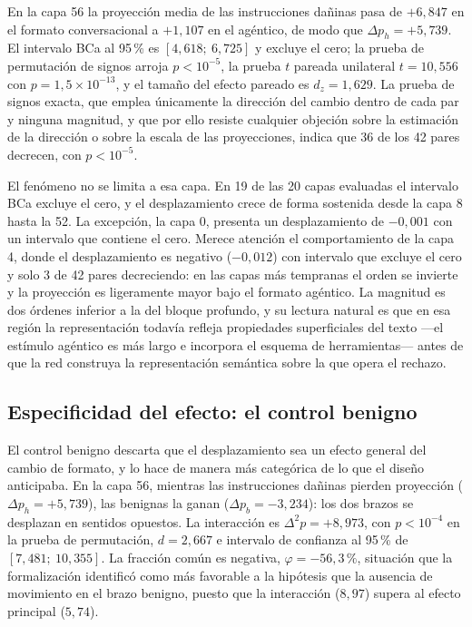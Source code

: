 \documentclass[12pt,a4paper]{article}
\begin{document}
En la capa 56 la proyección media de las instrucciones dañinas pasa de $+6{,}847$ en el formato conversacional a $+1{,}107$ en el agéntico, de modo que $\Delta p_{h} = +5{,}739$. El intervalo BCa al 95\,\% es $[4{,}618;\ 6{,}725]$ y excluye el cero; la prueba de permutación de signos arroja $p < 10^{-5}$, la prueba $t$ pareada unilateral $t = 10{,}556$ con $p = 1{,}5 \times 10^{-13}$, y el tamaño del efecto pareado es $d_z = 1{,}629$. La prueba de signos exacta, que emplea únicamente la dirección del cambio dentro de cada par y ninguna magnitud, y que por ello resiste cualquier objeción sobre la estimación de la dirección o sobre la escala de las proyecciones, indica que 36 de los 42 pares decrecen, con $p < 10^{-5}$.

El fenómeno no se limita a esa capa. En 19 de las 20 capas evaluadas el intervalo BCa excluye el cero, y el desplazamiento crece de forma sostenida desde la capa 8 hasta la 52. La excepción, la capa 0, presenta un desplazamiento de $-0{,}001$ con un intervalo que contiene el cero. Merece atención el comportamiento de la capa 4, donde el desplazamiento es negativo ($-0{,}012$) con intervalo que excluye el cero y solo 3 de 42 pares decreciendo: en las capas más tempranas el orden se invierte y la proyección es ligeramente mayor bajo el formato agéntico. La magnitud es dos órdenes inferior a la del bloque profundo, y su lectura natural es que en esa región la representación todavía refleja propiedades superficiales del texto —el estímulo agéntico es más largo e incorpora el esquema de herramientas— antes de que la red construya la representación semántica sobre la que opera el rechazo.

\subsection{Especificidad del efecto: el control benigno}

\justifying

El control benigno descarta que el desplazamiento sea un efecto general del cambio de formato, y lo hace de manera más categórica de lo que el diseño anticipaba. En la capa 56, mientras las instrucciones dañinas pierden proyección ($\Delta p_{h} = +5{,}739$), las benignas la ganan ($\Delta p_{b} = -3{,}234$): los dos brazos se desplazan en sentidos opuestos. La interacción es $\Delta^{2} p = +8{,}973$, con $p < 10^{-4}$ en la prueba de permutación, $d = 2{,}667$ e intervalo de confianza al 95\,\% de $[7{,}481;\ 10{,}355]$. La fracción común es negativa, $\varphi = -56{,}3\,\%$, situación que la formalización identificó como más favorable a la hipótesis que la ausencia de movimiento en el brazo benigno, puesto que la interacción ($8{,}97$) supera al efecto principal ($5{,}74$).
\end{document}
